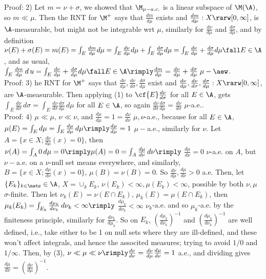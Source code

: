 \noindent
Proof: 2) Let $m = \nu + \sigma$, we showed that $\M_{\mu-a.c.}$ is a linear subspace of $\M(\A)$, so $m \ll \mu$. Then the RNT for $\M^+$ says that $\frac{dm}{d\mu}$ exists and $\frac{dm}{d\mu}: X \rarw [0,\infty]$, is $\A$-measurable, but might not be integrable wrt $\mu$, similarly for $\frac{d\nu}{d\mu}$ and $\frac{d\sigma}{d\mu}$, and by definition $\nu(E) + \sigma(E) = m(E) = \int_E \frac{dm}{d\mu} d\mu = \int_E \frac{d\nu}{d\mu} d\mu + \int_E \frac{d\sigma}{d\mu} d\mu = \int_E \frac{d\nu}{d\mu} + \frac{d\sigma}{d\mu} d\mu \fall E \in \A$, and as usual, $\int_E \frac{dm}{d\mu} \, d\,u = \int_E \frac{d\nu}{d\mu} + \frac{d\sigma}{d\mu} d\mu \fall E \in \A \rimply \frac{dm}{d\mu} = \frac{d\nu}{d\mu} + \frac{d\sigma}{d\mu} \; \mu - \aew$.  \\


\noindent
Proof: 3)  he RNT for $\M^+$ says that $\frac{d\nu}{d\mu},\frac{d\nu}{d\sigma},\frac{d\sigma}{d\mu} $ exist and $\frac{d\nu}{d\mu},\frac{d\nu}{d\sigma},\frac{d\sigma}{d\mu}: X \rarw [0,\infty]$, are $\A$-measurable. Then applying (1) to $\cf{E}\frac{d\nu}{d\sigma}$ for all $E \in \A$, gets $ \int_E \frac{d\nu}{d\sigma} \, d\sigma = \int_E \frac{d\nu}{d\sigma} \frac{d\sigma}{d\mu} \, d\mu$ for all $E \in \A$, so again $ \frac{d\nu}{d\sigma} \frac{d\sigma}{d\mu}  = \frac{d\nu}{d\sigma}$ $\mu$-a.e..\\


\noindent
Proof: 4) $\mu \ll \mu$, $\nu \ll \nu$, and $\frac{d\mu}{d\mu} = 1 = \frac{d\nu}{d\nu}$ $\mu,\nu$-a.e., because for all $E \in \A$, $\mu(E) = \int_E d\mu = \int_E \frac{d\mu}{d\mu} \, d\mu \rimply \frac{d\mu}{d\mu} = 1$ $\mu-$a.e., similarly for $\nu$.  Let $A = \{ x \in X; \frac{d\nu}{d\mu} (x) = 0 \}$, then $\nu(A) = \int_A 0 \, d\mu = 0 \rimply \mu(A) = 0 = \int_A \frac{d\mu}{d\nu} \, d\nu \rimply$ $ \frac{d\mu}{d\nu} = 0$ $\nu$-a.e. on $A$, but $\nu-$a.e. on a $\nu$-null set means everywhere, and similarly, $B = \{ x \in X; \frac{d\mu}{d\nu} (x) = 0 \}$, $\mu(B) = \nu(B) = 0$. So $\frac{d\nu}{d\mu}, \frac{d\mu}{d\nu} > 0$ a.e. Then, let $\{E_k \}_{k \in \nats} \in \A$, $X = \cup_k E_k$, $\nu(E_k) < \infty, \mu(E_k) < \infty$, possible by both $\nu, \mu$ $\sigma$-finite. Then let $\nu_k(E) = \nu(E \cap E_k)$, $\mu_k(E) = \mu(E \cap E_k)$, then $\mu_k(E_k) = \int_{E_k} \frac{d\mu_k}{d\nu_k} \, d\nu_k < \infty \rimply$ $\frac{d\mu_k}{d\nu_k} < \infty$ $\nu_k$-a.e. and so $\mu_k$-a.e. by the finiteness principle, similarly for $\frac{d\nu_k}{d\mu_k}$. So on $E_k$, $\left( \frac{d\mu_k}{d\nu_k} \right) ^{-1}$ and $\left( \frac{d\mu_k}{d\nu_k} \right) ^{-1}$ are well defined, i.e., take either to be 1 on null sets where they are ill-defined, and these won't affect integrals, and hence the associted measures; trying to avoid $1/0$ and $1/\infty$. Then, by (3), $ \nu \ll \mu \ll \nu \rimply \frac{d\nu}{d\nu}= \frac{d\nu}{d\mu}\frac{d\mu}{d\nu} = 1$ a.e., and dividing gives $\frac{d\mu}{d\nu} = \left( \frac{d\nu}{d\mu} \right)^{-1}$.













